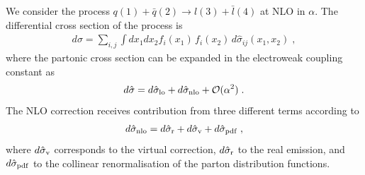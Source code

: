 \documentclass[12pt,a4paper]{article}
\newcommand{\beq}{\begin{eqnarray}}
\newcommand{\eeq}{\end{eqnarray}}
\begin{document}
We consider the process $q(1) +\bar{q}(2) \rightarrow l(3)+\bar{l}(4)$ at NLO in $\alpha$. The differential cross section of the process is
\beq
d\sigma= \sum_{i,j} \int dx_1 dx_2 f_i(x_1) \, f_i(x_2) \, d\hat{\sigma}_{ij}(x_1, x_2) \; ,
\eeq
where the partonic cross section can be expanded in the electroweak coupling constant as
\beq
d\hat{\sigma}= d\hat{\sigma}_{\rm lo}+d\hat{\sigma}_{\rm nlo}+\mathcal{O}(\alpha^2) \; .
\eeq
The NLO correction receives contribution from three different terms according to 
\beq
d\hat{\sigma}_{\rm nlo}=d\hat{\sigma}_{\rm r}+d\hat{\sigma}_{\rm v}+d\hat{\sigma}_{\rm pdf} \; ,
\eeq
where $d\hat{\sigma}_{\rm v}$ corresponds to the virtual correction, $d\hat{\sigma}_{\rm r}$ to the real emission, and $d\hat{\sigma}_{\rm pdf}$ to the collinear renormalisation of the parton distribution functions.
\end{document}
